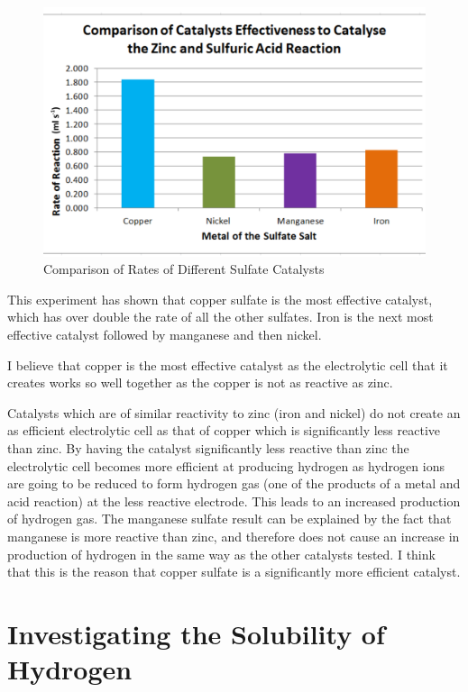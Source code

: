 \begin{figure}[H]
    \includegraphics[width=\textwidth]{./Analysis/Images/4DifferentCatalysts/Comparison.pdf}
    \caption{Comparison of Rates of Different Sulfate Catalysts} \label{fig:ComparisonCat}
\end{figure}

This experiment has shown that copper sulfate is the most effective catalyst, which has over double the rate of all the other sulfates. Iron is the next most effective catalyst followed by manganese and then nickel.

I believe that copper is the most effective catalyst as the electrolytic cell that it creates works so well together as the copper is not as reactive as zinc. 

Catalysts which are of similar reactivity to zinc (iron and nickel) do not create an as efficient electrolytic cell as that of copper which is significantly less reactive than zinc. By having the catalyst significantly less reactive than zinc the electrolytic cell becomes more efficient at producing hydrogen as hydrogen ions are going to be reduced to form hydrogen gas (one of the products of a metal and acid reaction) at the less reactive electrode. This leads to an increased production of hydrogen gas. The manganese sulfate result can be explained by the fact that manganese is more reactive than zinc, and therefore does not cause an increase in production of hydrogen in the same way as the other catalysts tested. I think that this is the reason that copper sulfate is a significantly more efficient catalyst.

\section{Investigating the Solubility of Hydrogen} 

